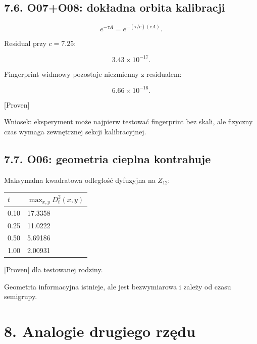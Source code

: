 \documentclass[11pt,a4paper,openany]{report}
\newcommand{\statusProven}{\textcolor{fingreen}{[Proven]}}
\begin{document}
\section{7.6. O07+O08: dokładna orbita kalibracji}

\[
e^{-\tau A}
=e^{-(\tau/c)(cA)}.
\]

Residual przy \(c=7.25\):

\[
3.43\times10^{-17}.
\]

Fingerprint widmowy pozostaje niezmienny z residualem:

\[
6.66\times10^{-16}.
\]

\statusProven{}

Wniosek: eksperyment mo\.ze najpierw testować fingerprint bez skali, ale fizyczny czas wymaga zewnętrznej sekcji kalibracyjnej.

\section{7.7. O06: geometria cieplna kontrahuje}

Maksymalna kwadratowa odległość dyfuzyjna na \(Z_{12}\):

\begin{center}
\begingroup\small
\setlength{\tabcolsep}{2.5pt}
\renewcommand{\arraystretch}{1.16}
\begin{longtable}{@{}p{}p{}@{}}
\toprule
\textbf{\(t\)} & \textbf{\(\max_{x,y}D_t^2(x,y)\)} \\
\midrule
\endhead
0.10 & 17.3358 \\
0.25 & 11.0222 \\
0.50 & 5.69186 \\
1.00 & 2.00931 \\
\bottomrule
\end{longtable}
\endgroup
\end{center}

\statusProven{} dla testowanej rodziny.

Geometria informacyjna istnieje, ale jest bezwymiarowa i zale\.zy od czasu semigrupy.

\chapter{8. Analogie drugiego rzędu}
\end{document}
